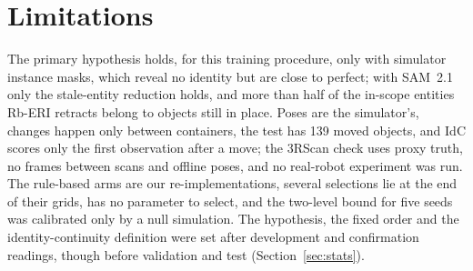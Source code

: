 \section{Limitations}
\label{sec:limitations}

The primary hypothesis holds, for this training procedure, only with simulator instance masks, which reveal no identity but are close to perfect; with SAM~2.1 only the stale-entity reduction holds, and more than half of the in-scope entities Rb-ERI retracts belong to objects still in place.
Poses are the simulator's, changes happen only between containers, the test has 139 moved objects, and IdC scores only the first observation after a move; the 3RScan check uses proxy truth, no frames between scans and offline poses, and no real-robot experiment was run.
The rule-based arms are our re-implementations, several selections lie at the end of their grids,  has no parameter to select, and the two-level bound for five seeds was calibrated only by a null simulation.
The hypothesis, the fixed order and the identity-continuity definition were set after development and confirmation readings, though before validation and test (Section~\ref{sec:stats}).
